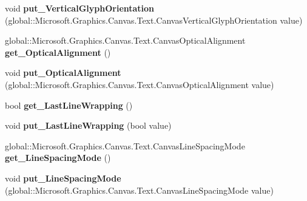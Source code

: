 \begin{DoxyCompactItemize}
void {\bfseries put\+\_\+\+Vertical\+Glyph\+Orientation} (global\+::\+Microsoft.\+Graphics.\+Canvas.\+Text.\+Canvas\+Vertical\+Glyph\+Orientation value)
\item 
\mbox{\label{class_microsoft_1_1_graphics_1_1_canvas_1_1_text_1_1_canvas_text_format_a531fd44472e54817a9c459cce652d68f}} 
global\+::\+Microsoft.\+Graphics.\+Canvas.\+Text.\+Canvas\+Optical\+Alignment {\bfseries get\+\_\+\+Optical\+Alignment} ()
\item 
\mbox{\label{class_microsoft_1_1_graphics_1_1_canvas_1_1_text_1_1_canvas_text_format_a425c22e2e7141efc0555fd442659f0b7}} 
void {\bfseries put\+\_\+\+Optical\+Alignment} (global\+::\+Microsoft.\+Graphics.\+Canvas.\+Text.\+Canvas\+Optical\+Alignment value)
\item 
\mbox{\label{class_microsoft_1_1_graphics_1_1_canvas_1_1_text_1_1_canvas_text_format_aa855b7b2956b2494052e9cdd55b02fb4}} 
bool {\bfseries get\+\_\+\+Last\+Line\+Wrapping} ()
\item 
\mbox{\label{class_microsoft_1_1_graphics_1_1_canvas_1_1_text_1_1_canvas_text_format_a3a6a2fc656c46147b1092b31a50db0c1}} 
void {\bfseries put\+\_\+\+Last\+Line\+Wrapping} (bool value)
\item 
\mbox{\label{class_microsoft_1_1_graphics_1_1_canvas_1_1_text_1_1_canvas_text_format_a27e6bacad5baec82340ced77aff91b82}} 
global\+::\+Microsoft.\+Graphics.\+Canvas.\+Text.\+Canvas\+Line\+Spacing\+Mode {\bfseries get\+\_\+\+Line\+Spacing\+Mode} ()
\item 
\mbox{\label{class_microsoft_1_1_graphics_1_1_canvas_1_1_text_1_1_canvas_text_format_a886014158def86d2f1cff0ef5008817f}} 
void {\bfseries put\+\_\+\+Line\+Spacing\+Mode} (global\+::\+Microsoft.\+Graphics.\+Canvas.\+Text.\+Canvas\+Line\+Spacing\+Mode value)
\item 
\mbox{\label{class_microsoft_1_1_graphics_1_1_canvas_1_1_text_1_1_canvas_text_format_ad94de231bbaf0d4dc6bb416b81343159}} 

\end{DoxyCompactItemize}

